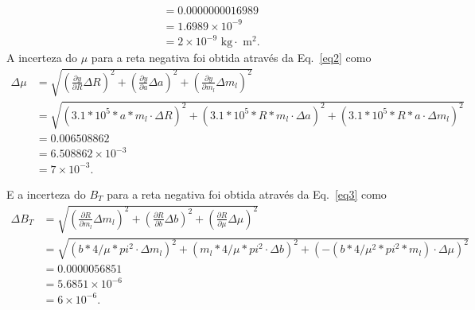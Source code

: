 \begin{enumerate}
\begin{align*}
&=0.0000000016989 \\
&=1.6989 \times 10^{-9} \\
&=2 \times 10^{-9} \text{ kg$\cdot$ m$^2$}.  
\end{align*}
A incerteza do $\mu$ para a reta negativa foi obtida através  da Eq.~\ref{eq2} como 
\begin{align*}
\Delta \mu &=\sqrt{\left(\frac{\partial y}{\partial R} \Delta R\right)^{2}+\left(\frac{\partial y}{\partial a} \Delta a\right)^{2}+\left(\frac{\partial y}{\partial m_l} \Delta m_l\right)^{2}} \\
&=\sqrt{(3.1*10^{5} * a * m_l \cdot \Delta R)^{2}+(3.1*10^{5} * R * m_l \cdot \Delta a)^{2}+(3.1*10^{5} * R * a \cdot \Delta m_l)^{2}} \\
&=0.006508862 \\
&=6.508862 \times 10^{-3} \\
&=7 \times 10^{-3}. 
\end{align*}
\end{enumerate}

E a incerteza do $B_T$ para a reta negativa foi obtida através  da Eq.~\ref{eq3} como 
\begin{align*}
\Delta B_T &=\sqrt{\left(\frac{\partial R}{\partial m_l} \Delta m_l\right)^{2}+\left(\frac{\partial R}{\partial b} \Delta b\right)^{2}+\left(\frac{\partial R}{\partial \mu} \Delta \mu\right)^{2}} \\
&=\sqrt{\left(b * 4 / \mu * p i^{2} \cdot \Delta m_l\right)^{2}+\left(m_l * 4 / \mu * p i^{2} \cdot \Delta b\right)^{2}+\left(-\left(b * 4 / \mu^{2} * p i^{2} * m_l\right) \cdot \Delta \mu\right)^{2}} \\
&=0.0000056851 \\
&=5.6851 \times 10^{-6} \\
&=6 \times 10^{-6}.
\end{align*}
